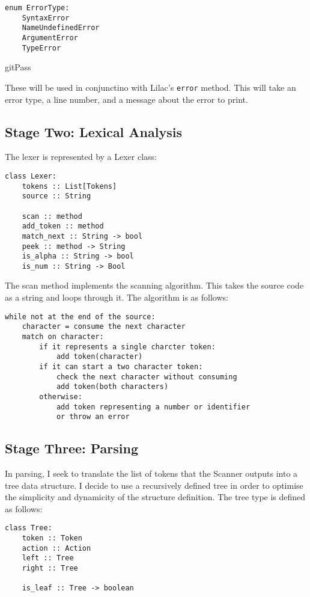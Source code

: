 \documentclass[a4paper, 12pt]{article}
\begin{document}
\begin{verbatim}
enum ErrorType:
	SyntaxError
	NameUndefinedError
	ArgumentError
	TypeError
\end{verbatim}

gitPass

These will be used in conjunctino with Lilac's \verb|error| method. This will take an error type, a line number, and a message about the error to print.

\subsection{Stage Two: Lexical Analysis}\label{sec:stage-two-lexical-analysis}
The lexer is represented by a Lexer class:

\begin{verbatim}
class Lexer:
    tokens :: List[Tokens]
    source :: String

    scan :: method
    add_token :: method
    match_next :: String -> bool
    peek :: method -> String
    is_alpha :: String -> bool
    is_num :: String -> Bool
\end{verbatim}

The scan method implements the scanning algorithm. This takes the source code as a string and loops through it. The algorithm is as follows:
\begin{verbatim}
while not at the end of the source:
    character = consume the next character
    match on character:
        if it represents a single charcter token:
            add token(character)
        if it can start a two character token:
            check the next character without consuming
            add token(both characters)
        otherwise:
            add token representing a number or identifier
            or throw an error

\end{verbatim}

\subsection{Stage Three: Parsing}\label{sec:stage-three-parsing}
In parsing, I seek to translate the list of tokens that the Scanner outputs into a tree data structure. I decide to use a recursively defined tree in order to optimise the simplicity and dynamicity of the structure definition. The tree type is defined as follows:\\
\begin{verbatim}
class Tree:
	token :: Token
	action :: Action
	left :: Tree
	right :: Tree

	is_leaf :: Tree -> boolean
\end{verbatim}
\end{document}
